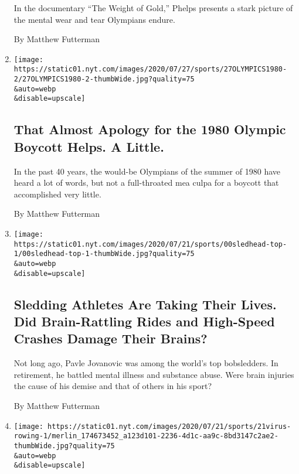\begin{enumerate}
  In the documentary ``The Weight of Gold,'' Phelps presents a stark
  picture of the mental wear and tear Olympians endure.

  By Matthew Futterman
\item
  \href{/2020/07/27/sports/olympics/1980-boycott.html}{}

  \texttt{[image: https://static01.nyt.com/images/2020/07/27/sports/27OLYMPICS1980-2/27OLYMPICS1980-2-thumbWide.jpg?quality=75\\\&auto=webp\\\&disable=upscale]}

  \hypertarget{that-almost-apology-for-the-1980-olympic-boycott-helps-a-little}{%
  \subsection{That Almost Apology for the 1980 Olympic Boycott Helps. A
  Little.}\label{that-almost-apology-for-the-1980-olympic-boycott-helps-a-little}}

  In the past 40 years, the would-be Olympians of the summer of 1980
  have heard a lot of words, but not a full-throated mea culpa for a
  boycott that accomplished very little.

  By Matthew Futterman
\item
  \href{/2020/07/26/sports/olympics/olympics-bobsled-suicide-brain-injuries.html}{}

  \texttt{[image: https://static01.nyt.com/images/2020/07/21/sports/00sledhead-top-1/00sledhead-top-1-thumbWide.jpg?quality=75\\\&auto=webp\\\&disable=upscale]}

  \hypertarget{sledding-athletes-are-taking-their-lives-did-brain-rattling-rides-and-high-speed-crashes-damage-their-brains}{%
  \subsection{Sledding Athletes Are Taking Their Lives. Did
  Brain-Rattling Rides and High-Speed Crashes Damage Their
  Brains?}\label{sledding-athletes-are-taking-their-lives-did-brain-rattling-rides-and-high-speed-crashes-damage-their-brains}}

  Not long ago, Pavle Jovanovic was among the world's top bobsledders.
  In retirement, he battled mental illness and substance abuse. Were
  brain injuries the cause of his demise and that of others in his
  sport?

  By Matthew Futterman
\item
  \href{/2020/07/24/sports/olympics/coronavirus-us-rowing-olympics.html}{}

  \texttt{[image: https://static01.nyt.com/images/2020/07/21/sports/21virus-rowing-1/merlin\_174673452\_a123d101-2236-4d1c-aa9c-8bd3147c2ae2-thumbWide.jpg?quality=75\\\&auto=webp\\\&disable=upscale]}


\end{enumerate}
